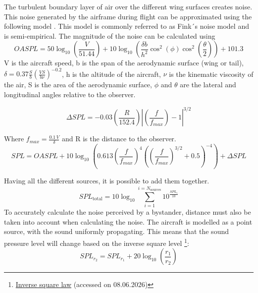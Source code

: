 The turbulent boundary layer of air over the different wing surfaces creates noise. 
This noise generated by the airframe during flight can be approximated using the following model \cite{Thoma2024}. This model is commonly referred to as Fink´s noise model and is semi-empirical. 
The magnitude of the noise can be calculated using 
\begin{equation}
    OASPL = 50\log_{10}\left(\frac{V}{51.44}\right) + 10\log_{10}\left(\frac{\delta b}{h^2}\cos^2(\phi)\cos^2\left(\frac{\theta}{2}\right)\right) + 101.3
\end{equation}
V is the aircraft speed, b is the span of the aerodynamic surface (wing or tail), $\delta = 0.37 \frac{S}{b} \left(\frac{VS}{b\nu}\right)^{-0.2}$, h is the altitude of the aircraft, $\nu$ is the kinematic viscosity of the air, S is the area of the aerodynamic surface, $\phi$ and $\theta$ are the lateral and longitudinal angles relative to the observer.      

\begin{equation}
    \Delta SPL = -0.03\left(\frac{R}{152.4}\right)\left|\left(\frac{f}{f_{max}}\right) - 1\right|^{3/2}
\end{equation}

Where $f_{max}= \frac{0.1\,V}{\delta}$ and R is the distance to the observer.  
\begin{equation}
    SPL = OASPL + 10\log_{10}\left(0.613\left(\frac{f}{f_{max}}\right)^4\left(\left(\frac{f}{f_{max}}\right)^{3/2} + 0.5\right)^{-4}\right) + \Delta SPL
\end{equation}



 
Having all the different sources, it is possible to add them together.  
\begin{equation}
    SPL_\text{total}=10 \log_{10} \sum^{i=N_\text{sources}}_{i=1}10^{\frac{SPL_i}{10}}
\end{equation}
To accurately calculate the noise perceived by a bystander, distance must also be taken into account when calculating the noise. The aircraft is modelled as a point source, with the sound uniformly propagating. This means that the sound pressure level will change based on the inverse square level \footnote{\href{https://personalpages.manchester.ac.uk/staff/richard.baker/BasicAcoustics/4_inverse_square_law.html}{Inverse square law} (accessed on 08.06.2026)}:
\begin{equation}
    SPL_{r_2}=SPL_{r_1}+20\log_{10}\left(\frac{r_1}{r_2}\right)
\end{equation}

